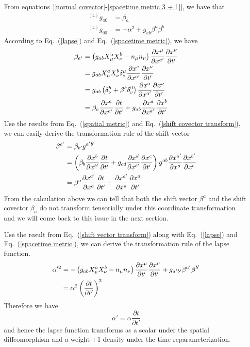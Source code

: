 \documentclass[letterpaper,nofootinbib,prd,amsmath,onecolumn]{revtex4-1}
\begin{document}
From equations [\ref{normal covector}-\ref{spacetime metric 3 + 1}], we have that
\begin{align}
^{\left(4\right)}g_{a0} & = \beta_{a}\label{lapse}\\
^{\left(4\right)}g_{00} & = -\alpha^2 + g_{ab}\beta^{a}\beta^{b}\label{shift}
\end{align}
According to Eq.~(\ref{lapse}) and Eq.~(\ref{spacetime metric}), we have
\begin{align}
\beta_{a'} & = \left(g_{ab}X^{a}_{\mu}X^{b}_{\nu} - n_{\mu}n_{\nu}\right)\frac{\partial x^{\mu}}{\partial x^{a'}}\frac{\partial x^{\nu}}{\partial t'}\notag\\
& = g_{ab}X^{a}_{\mu}X^{b}_{\nu}\delta_{c}^{\mu}\frac{\partial x^{c}}{\partial x^{a'}}\frac{\partial x^{\nu}}{\partial t'}\notag\\
& = g_{ab}\left(\delta^{b}_{\nu} + \beta^{b}\delta^{0}_{\nu}\right)\frac{\partial x^{a}}{\partial x^{a'}}\frac{\partial x^{\nu}}{\partial t'}\notag\\
& = \beta_{a}\frac{\partial x^{a}}{\partial x^{a'}}\frac{\partial t}{\partial t'} + g_{ab}\frac{\partial x^{a}}{\partial x^{a'}}\frac{\partial x^{b}}{\partial t'}\label{shift covector transform}
\end{align}
Use the results from Eq.~(\ref{spatial metric}) and Eq.~(\ref{shift covector transform}), we can easily derive the transformation rule of the shift vector
\begin{align}
\beta^{a'} & = \beta_{b'}g^{a'b'}\notag\\
& = \left(\beta_{b}\frac{\partial x^{b}}{\partial x^{b'}}\frac{\partial t}{\partial t'} + g_{cd}\frac{\partial x^{d}}{\partial x^{b'}}\frac{\partial x^{c}}{\partial t'}\right)g^{ab}\frac{\partial x^{a'}}{\partial x^{a}}\frac{\partial x^{b'}}{\partial x^{b}}\notag\\
& = \beta^{a}\frac{\partial x^{a'}}{\partial x^{a}}\frac{\partial t}{\partial t'} + \frac{\partial x^{a'}}{\partial x^{a}}\frac{\partial x^{a}}{\partial t'}\label{shift vector transform}
\end{align}
From the calculation above we can tell that both the shift vector $\beta^{a}$ and the shift covector $\beta_{a}$ do not transform tensorially under this coordinate transformation and we will come back to this issue in the next section. 

Use the result from Eq.~(\ref{shift vector transform}) along with Eq.~(\ref{lapse}) and Eq.~(\ref{spacetime metric}), we can derive the transformation rule of the lapse function. 
\begin{align*}
\alpha'^{2} & = - \left(g_{ab}X^{a}_{\mu}X^{b}_{\nu} - n_{\mu}n_{\nu}\right)\frac{\partial x^{\mu}}{\partial t'}\frac{\partial x^{\nu}}{\partial t'} + g_{a'b'}\beta^{a'}\beta^{b'}\notag\\ 
& = \alpha^2\left(\frac{\partial t}{\partial t'}\right)^{2}
\end{align*}
Therefore we have
\begin{equation}
\alpha' = \alpha\frac{\partial t}{\partial t'}\label{lapse transform}
\end{equation}
and hence the lapse function transforms as a scalar under the spatial diffeomorphism and a weight +1 density under the time reparameterization. 
 
\end{document}
